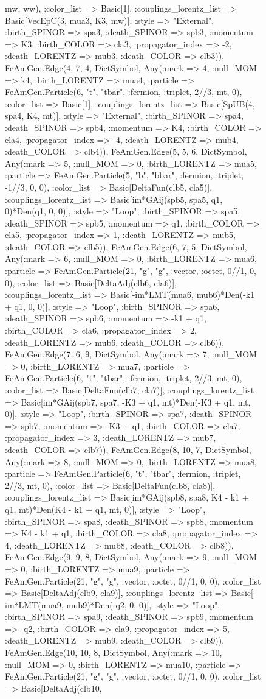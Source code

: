 \documentclass{revtex4}
\begin{document}
\begin{figure}[!htb]
\begin{center}
{mw, ww), :color_list => Basic[1], :couplings_lorentz_list => Basic[VecEpC(3, mua3, K3, mw)], :style => "External", :birth_SPINOR => spa3, :death_SPINOR => spb3, :momentum => K3, :birth_COLOR => cla3, :propagator_index => -2, :death_LORENTZ => mub3, :death_COLOR => clb3)), FeAmGen.Edge(4, 7, 4, Dict{Symbol, Any}(:mark => 4, :null_MOM => k4, :birth_LORENTZ => mua4, :particle => FeAmGen.Particle(6, "t", "tbar", :fermion, :triplet, 2//3, mt, 0), :color_list => Basic[1], :couplings_lorentz_list => Basic[SpUB(4, spa4, K4, mt)], :style => "External", :birth_SPINOR => spa4, :death_SPINOR => spb4, :momentum => K4, :birth_COLOR => cla4, :propagator_index => -4, :death_LORENTZ => mub4, :death_COLOR => clb4)), FeAmGen.Edge(5, 5, 6, Dict{Symbol, Any}(:mark => 5, :null_MOM => 0, :birth_LORENTZ => mua5, :particle => FeAmGen.Particle(5, "b", "bbar", :fermion, :triplet, -1//3, 0, 0), :color_list => Basic[DeltaFun(clb5, cla5)], :couplings_lorentz_list => Basic[im*GAij(spb5, spa5, q1, 0)*Den(q1, 0, 0)], :style => "Loop", :birth_SPINOR => spa5, :death_SPINOR => spb5, :momentum => q1, :birth_COLOR => cla5, :propagator_index => 1, :death_LORENTZ => mub5, :death_COLOR => clb5)), FeAmGen.Edge(6, 7, 5, Dict{Symbol, Any}(:mark => 6, :null_MOM => 0, :birth_LORENTZ => mua6, :particle => FeAmGen.Particle(21, "g", "g", :vector, :octet, 0//1, 0, 0), :color_list => Basic[DeltaAdj(clb6, cla6)], :couplings_lorentz_list => Basic[-im*LMT(mua6, mub6)*Den(-k1 + q1, 0, 0)], :style => "Loop", :birth_SPINOR => spa6, :death_SPINOR => spb6, :momentum => -k1 + q1, :birth_COLOR => cla6, :propagator_index => 2, :death_LORENTZ => mub6, :death_COLOR => clb6)), FeAmGen.Edge(7, 6, 9, Dict{Symbol, Any}(:mark => 7, :null_MOM => 0, :birth_LORENTZ => mua7, :particle => FeAmGen.Particle(6, "t", "tbar", :fermion, :triplet, 2//3, mt, 0), :color_list => Basic[DeltaFun(clb7, cla7)], :couplings_lorentz_list => Basic[im*GAij(spb7, spa7, -K3 + q1, mt)*Den(-K3 + q1, mt, 0)], :style => "Loop", :birth_SPINOR => spa7, :death_SPINOR => spb7, :momentum => -K3 + q1, :birth_COLOR => cla7, :propagator_index => 3, :death_LORENTZ => mub7, :death_COLOR => clb7)), FeAmGen.Edge(8, 10, 7, Dict{Symbol, Any}(:mark => 8, :null_MOM => 0, :birth_LORENTZ => mua8, :particle => FeAmGen.Particle(6, "t", "tbar", :fermion, :triplet, 2//3, mt, 0), :color_list => Basic[DeltaFun(clb8, cla8)], :couplings_lorentz_list => Basic[im*GAij(spb8, spa8, K4 - k1 + q1, mt)*Den(K4 - k1 + q1, mt, 0)], :style => "Loop", :birth_SPINOR => spa8, :death_SPINOR => spb8, :momentum => K4 - k1 + q1, :birth_COLOR => cla8, :propagator_index => 4, :death_LORENTZ => mub8, :death_COLOR => clb8)), FeAmGen.Edge(9, 9, 8, Dict{Symbol, Any}(:mark => 9, :null_MOM => 0, :birth_LORENTZ => mua9, :particle => FeAmGen.Particle(21, "g", "g", :vector, :octet, 0//1, 0, 0), :color_list => Basic[DeltaAdj(clb9, cla9)], :couplings_lorentz_list => Basic[-im*LMT(mua9, mub9)*Den(-q2, 0, 0)], :style => "Loop", :birth_SPINOR => spa9, :death_SPINOR => spb9, :momentum => -q2, :birth_COLOR => cla9, :propagator_index => 5, :death_LORENTZ => mub9, :death_COLOR => clb9)), FeAmGen.Edge(10, 10, 8, Dict{Symbol, Any}(:mark => 10, :null_MOM => 0, :birth_LORENTZ => mua10, :particle => FeAmGen.Particle(21, "g", "g", :vector, :octet, 0//1, 0, 0), :color_list => Basic[DeltaAdj(clb10, }
\end{center}
\end{figure}
\end{document}
